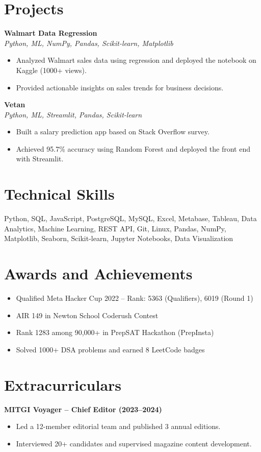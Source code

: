 \documentclass[a4paper,10pt]{article}
\begin{document}
\section*{Projects}

\textbf{Walmart Data Regression} \\
\textit{Python, ML, NumPy, Pandas, Scikit-learn, Matplotlib}
\begin{itemize}[left=0pt]
    \item Analyzed Walmart sales data using regression and deployed the notebook on Kaggle (1000+ views).
    \item Provided actionable insights on sales trends for business decisions.
\end{itemize}

\textbf{Vetan} \\
\textit{Python, ML, Streamlit, Pandas, Scikit-learn}
\begin{itemize}[left=0pt]
    \item Built a salary prediction app based on Stack Overflow survey.
    \item Achieved 95.7\% accuracy using Random Forest and deployed the front end with Streamlit.
\end{itemize}

\section*{Technical Skills}
Python, SQL, JavaScript, PostgreSQL, MySQL, Excel, Metabase, Tableau, Data Analytics, Machine Learning, REST API, Git, Linux, Pandas, NumPy, Matplotlib, Seaborn, Scikit-learn, Jupyter Notebooks, Data Visualization

\section*{Awards and Achievements}
\begin{itemize}[left=0pt]
    \item Qualified Meta Hacker Cup 2022 – Rank: 5363 (Qualifiers), 6019 (Round 1)
    \item AIR 149 in Newton School Coderush Contest
    \item Rank 1283 among 90,000+ in PrepSAT Hackathon (PrepInsta)
    \item Solved 1000+ DSA problems and earned 8 LeetCode badges
\end{itemize}

\section*{Extracurriculars}
\textbf{MITGI Voyager – Chief Editor (2023–2024)}
\begin{itemize}[left=0pt]
    \item Led a 12-member editorial team and published 3 annual editions.
    \item Interviewed 20+ candidates and supervised magazine content development.
\end{itemize}
\end{document}
